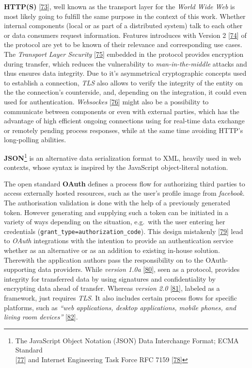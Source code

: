 \documentclass[12pt,english,a4paper,titlepage,cleardoublepage=empty,dottedtoc]{report}
\begin{document}
\textbf{HTTP(S)} {[}\protect\hyperlink{ref-web_spec_http1}{73}{]}, well
known as the transport layer for the \emph{World Wide Web} is most
likely going to fulfill the same purpose in the context of this work.
Whether internal components (local or as part of a distributed system)
talk to each other or data consumers request information. Features
introduces with Version 2
{[}\protect\hyperlink{ref-web_spec_http2}{74}{]} of the protocol are yet
to be known of their relevance and corresponding use cases. The
\emph{Transport Layer Security}
{[}\protect\hyperlink{ref-web_spec_tls}{75}{]} embedded in the protocol
provides encryption during transfer, which reduces the vulnerability to
\emph{man-in-the-middle} attacks and thus ensures data integrity. Due to
it's asymmetrical cryptographic concepts used to establish a connection,
\emph{TLS} also allows to verify the integrity of the entity on the the
connection's counterside, and, depending on the integration, it could
even used for authentication. \emph{Websockes}
{[}\protect\hyperlink{ref-web_spec_websockets}{76}{]} might also be a
possibility to communicate between components or even with external
parties, which has the advantage of high efficient ongoing connections
using for real-time data exchange or remotely pending process responses,
while at the same time avoiding HTTP's long-polling abilities.

\textbf{JSON}\footnote{The JavaScript Object Notation (JSON) Data
  Interchange Format; ECMA Standard\\
  {[}\protect\hyperlink{ref-web_spec_json}{77}{]} and Internet
  Engineering Task Force RFC 7159
  {[}\protect\hyperlink{ref-web_rfc_json}{78}{]}} is an alternative data
serialization format to XML, heavily used in web contexts, whose syntax
is inspired by the JavaScript object-literal notation.

The open standard \textbf{OAuth} defines a process flow for authorizing
third parties to access externally hosted resources, such as the user's
profile image from \emph{facebook}. The authorisation validation is done
with the help of a previously generated token. However generating and
supplying such a token can be initiated in a variety of ways depending
on the situation, e.g.~with the user entering her credentials
(\texttt{grant\_type=authorization\_code}). This design mistakenly
{[}\protect\hyperlink{ref-web_2012_problem-with-oauth-for-authentication}{79}{]}
lead to \emph{OAuth} integrations with the intention to provide an
authentication service whether as an alternative or as an addition to
existing in-house solution. Therewith the application authors pass the
responsibility on to the OAuth-supporting data providers. While
\emph{version 1.0a} {[}\protect\hyperlink{ref-web_spec_oauth-1a}{80}{]},
seen as a protocol, provides integrity for transferred data by using
signatures and confidentiality by encrypting data ahead of transfer.
Whereas \emph{version 2.0}
{[}\protect\hyperlink{ref-web_spec_oauth-2}{81}{]}, labeled as a
framework, just requires \emph{TLS}. It also includes certain process
flows for specific platforms, such as \emph{``web applications, desktop
applications, mobile phones, and living room devices''}
{[}\protect\hyperlink{ref-web_2016_oauth-2}{82}{]}.
\end{document}
